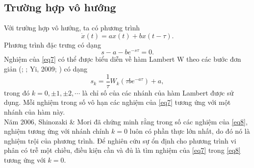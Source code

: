 \subsection{Trường hợp vô hướng}
Với trường hợp vô hướng, ta có phương trình
\begin{equation}\label{eq6}
	\dot{x}(t)=ax(t) + bx(t -\tau).
\end{equation}
Phương trình đặc trưng có dạng
\begin{equation}\label{eq7}
	s - a -b e ^{-s \tau} = 0.
\end{equation}
Nghiệm của \eqref{eq7} có thể được biểu diễn về hàm Lambert W theo các bước đơn giản (\cite{AslU03}; \cite{Cor96}; Yi, 2009; \cite{Yi10}) có dạng 
\begin{equation}\label{eq8}
	s_k = \dfrac{1}{\tau}W_k(\tau be^{-a\tau})+a,
\end{equation}
trong đó $k = 0, \pm 1, \pm2, \cdots$ là chỉ số của các nhánh của hàm Lambert được sử dụng. Mỗi nghiệm trong số vô hạn các nghiệm của \eqref{eq7} tương ứng với một nhánh của hàm này.\\
Năm 2006, Shinozaki \& Mori đã chứng minh rằng trong số các nghiệm của \eqref{eq8}, nghiệm tương ứng với nhánh chính $k =0$ luôn có phần thực lớn nhất, do đó nó là nghiệm trội của phương trình. Để nghiên cứu sự ổn định cho phương trình vi phân có trễ một chiều, điều kiện cần và đủ  là tìm nghiệm của \eqref{eq7} trong \eqref{eq8} tương ứng với $k =0$.\\

